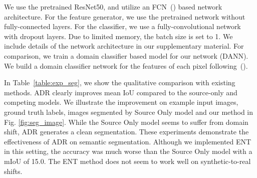 \documentclass{article} \usepackage{iclr2018_conference,times}
\begin{document}
We use the pretrained ResNet50, and utilize an FCN~(\cite{long2015fully}) based network architecture. For the feature generator, we use the pretrained network without fully-connected layers. For the classifier, we use a fully-convolutional network with dropout layers. Due to limited memory, the batch size is set to 1. We include details of the network architecture in our supplementary material. For comparison, we train a domain classifier based model for our network (DANN). We build a domain classifier network for the features of each pixel following~(\cite{hoffman2016fcns}).

In Table~\ref{table:exp_seg}, we show the qualitative comparison with existing methods. ADR clearly improves mean IoU compared to the source-only and competing models. We illustrate the improvement on example input images, ground truth labels, images segmented by Source Only model and our method in Fig. \ref{fig:seg_image}. While the Source Only model seems to suffer from domain shift, ADR generates a clean segmentation. These experiments demonstrate the effectiveness of ADR on semantic segmentation. Although we implemented ENT in this setting, the accuracy was much worse than the Source Only model with a mIoU of 15.0. The ENT method does not seem to work well on synthetic-to-real shifts.
\end{document}
